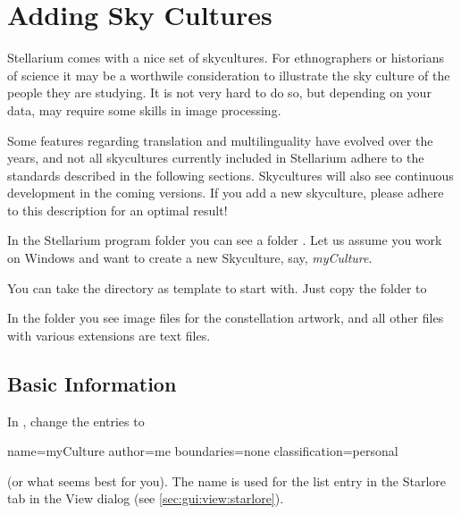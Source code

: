 

\chapter{Adding Sky Cultures}
\label{ch:SkyCultures}

Stellarium comes with a nice set of skycultures. For ethnographers or
historians of science it may be a worthwile consideration to
illustrate the sky culture of the people they are studying. It is not
very hard to do so, but depending on your data, may require some
skills in image processing. 

Some features regarding translation and multilinguality have evolved
over the years, and not all skycultures currently included in
Stellarium adhere to the standards described in the following
sections. Skycultures will also see continuous development in the
coming versions. If you add a new skyculture, please adhere to this
description for an optimal result!


In the Stellarium program folder you can see a folder
. Let us assume you work on Windows and want to create a
new Skyculture, say, \emph{myCulture}.

You can take the  directory as template to start with. Just copy the folder 
 to

In the folder you see image files for the constellation artwork, and all
other files with various extensions are text files. 


\section{Basic Information}
\label{sec:skycultures:info.ini}


In , change the entries to 
\begin{configfile}
[info]
name=myCulture
author=me
boundaries=none
classification=personal
\end{configfile}

\noindent (or what seems best for you). The name is used for the list entry in
the Starlore tab in the View dialog (see \ref{sec:gui:view:starlore}).

